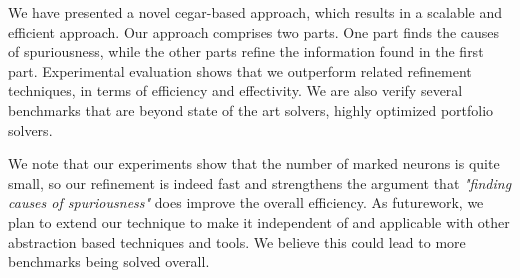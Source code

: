 We have presented a novel cegar-based approach, which results in a scalable and efficient approach.  Our approach comprises two parts. One part finds the causes of spuriousness, while the other parts refine  the information found in the first part. Experimental evaluation shows that we outperform related refinement techniques, in terms of efficiency and effectivity. We are also verify several benchmarks that are beyond state of the art solvers, highly optimized portfolio solvers.

We note that our experiments show that the number of marked neurons is quite small, so our refinement is indeed fast and strengthens the argument that {\em "finding causes of spuriousness"} does improve the overall efficiency. As futurework, we plan to extend our technique to make it independent of \deeppoly{} and applicable with other abstraction based techniques and tools. We believe this could lead to more benchmarks being solved overall. %

